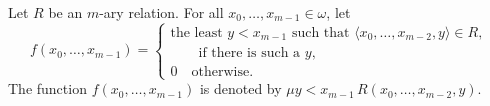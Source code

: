 Let $R$ be an $m$-ary relation. For all $x_0, \ldots, x_{m-1} \in \omega$, let
$$f(x_0, \ldots, x_{m-1}) = \begin{cases}
\text{the least } y < x_{m-1} \text{ such that } \langle x_0, \ldots, x_{m-2}, y \rangle \in R, \\
\qquad \text{if there is such a } y, \\
0 \quad \text{otherwise.}
\end{cases}$$
The function $f(x_0, \ldots, x_{m-1})$ is denoted by $\mu y < x_{m-1} \, R(x_0, \ldots, x_{m-2}, y)$.
